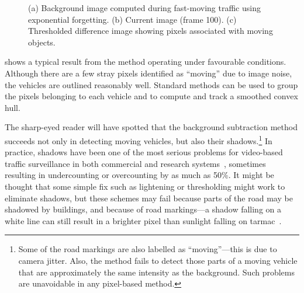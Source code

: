 \begin{figure}[t]
\centering
{}
\caption{(a) Background image computed during fast-moving traffic
using exponential forgetting. (b) Current image (frame 100). (c) Thresholded
difference image showing pixels associated with moving objects.}
\label{fast-traffic-figure}
\end{figure}

 shows a typical result from the method
operating under favourable conditions. Although there are a few stray
pixels identified as ``moving'' due to image noise, the vehicles are
outlined reasonably well. Standard methods can be used to group the
pixels belonging to each vehicle and to compute and track a smoothed
convex hull.

The sharp-eyed reader will have spotted that the background
subtraction method succeeds not only in detecting moving vehicles, but
also their shadows.\footnote{Some of the road markings are also
labelled as ``moving''---this is due to camera jitter.
Also, the method fails to detect those parts of a moving vehicle that
are approximately the same intensity as the background.
Such problems are unavoidable in any pixel-based method.}
In practice, shadows have been one of the most
serious problems for video-based traffic surveillance in both
commercial and research systems~\cite{Michalopoulos:1991}, sometimes
resulting in undercounting or overcounting by as much as 50\%.  It
might be thought that some simple fix such as lightening or
thresholding might work to eliminate shadows, but these schemes may fail
because parts of the road may be shadowed by buildings, and because of
road markings---a shadow falling on a white line can still result in a
brighter pixel than sunlight falling on tarmac~\cite{Kilger:1992}.

